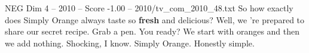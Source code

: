 \begin{textsample}{NEG Dim 4 – 2010 – Score -1.00 – 2010/tv\_com\_2010\_48.txt}  \label{ex:f4_neg_041}
So how exactly does Simply Orange always taste so \textbf{fresh} and delicious?
Well, we 're prepared to share our secret recipe.
Grab a pen.
You ready?
We start with oranges and then we add nothing.
Shocking, I know.
Simply Orange.
Honestly simple.

\end{textsample}
